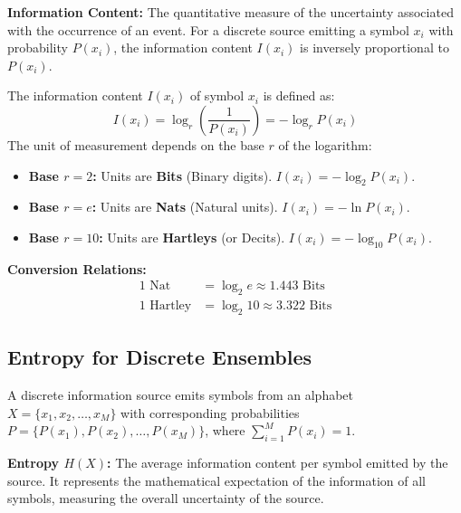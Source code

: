 \documentclass[12pt,a4paper]{article}
\begin{document}
\begin{tcolorbox}[defbox]
\textbf{Information Content:} The quantitative measure of the uncertainty associated with the occurrence of an event. For a discrete source emitting a symbol $x_i$ with probability $P(x_i)$, the information content $I(x_i)$ is inversely proportional to $P(x_i)$.
\end{tcolorbox}

\begin{tcolorbox}[formulabox, title={\textbf{Information Measurement Formula}}]
The information content $I(x_i)$ of symbol $x_i$ is defined as:
\begin{equation}
  I(x_i) = \log_r \left( \frac{1}{P(x_i)} \right) = -\log_r P(x_i)
\end{equation}
The unit of measurement depends on the base $r$ of the logarithm:
\begin{itemize}[leftmargin=1.5em, itemsep=2pt, topsep=2pt]
  \item[] \textbf{Base $r = 2$:} Units are \textbf{Bits} (Binary digits). $I(x_i) = -\log_2 P(x_i)$.
  \item[] \textbf{Base $r = e$:} Units are \textbf{Nats} (Natural units). $I(x_i) = -\ln P(x_i)$.
  \item[] \textbf{Base $r = 10$:} Units are \textbf{Hartleys} (or Decits). $I(x_i) = -\log_{10} P(x_i)$.
\end{itemize}
\textbf{Conversion Relations:}
\begin{align}
  1 \text{ Nat} &= \log_2 e \approx 1.443 \text{ Bits} \\
  1 \text{ Hartley} &= \log_2 10 \approx 3.322 \text{ Bits}
\end{align}
\end{tcolorbox}

\subsection{Entropy for Discrete Ensembles}
A discrete information source emits symbols from an alphabet $X = \{x_1, x_2, \dots, x_M\}$ with corresponding probabilities $P = \{P(x_1), P(x_2), \dots, P(x_M)\}$, where $\sum_{i=1}^M P(x_i) = 1$.

\begin{tcolorbox}[defbox]
\textbf{Entropy $H(X)$:} The average information content per symbol emitted by the source. It represents the mathematical expectation of the information of all symbols, measuring the overall uncertainty of the source.
\end{tcolorbox}
\end{document}
